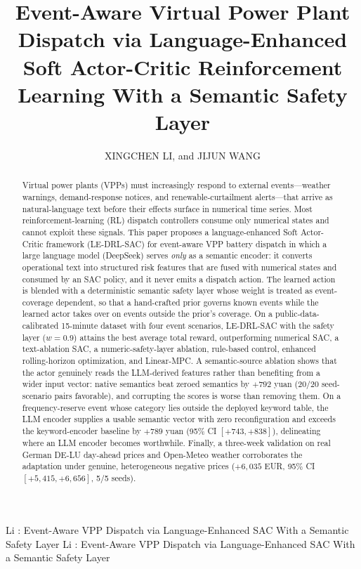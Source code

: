 \documentclass{ieeeaccess}
\begin{document}
\history{}
\doi{}

\title{Event-Aware Virtual Power Plant Dispatch via Language-Enhanced Soft Actor-Critic Reinforcement Learning With a Semantic Safety Layer}

\author{\uppercase{Xingchen Li}, and \uppercase{Jijun Wang}}
\address[1]{Shanghai University of Electric Power, Shanghai, China (e-mail: to be added)}
\address[2]{Shanghai University of Electric Power, Shanghai, China (e-mail: to be added)}

\markboth
{Li \headeretal: Event-Aware VPP Dispatch via Language-Enhanced SAC With a Semantic Safety Layer}
{Li \headeretal: Event-Aware VPP Dispatch via Language-Enhanced SAC With a Semantic Safety Layer}


\begin{abstract}
Virtual power plants (VPPs) must increasingly respond to external events---weather warnings, demand-response notices, and renewable-curtailment alerts---that arrive as natural-language text before their effects surface in numerical time series. Most reinforcement-learning (RL) dispatch controllers consume only numerical states and cannot exploit these signals. This paper proposes a language-enhanced Soft Actor-Critic framework (LE-DRL-SAC) for event-aware VPP battery dispatch in which a large language model (DeepSeek) serves \emph{only} as a semantic encoder: it converts operational text into structured risk features that are fused with numerical states and consumed by an SAC policy, and it never emits a dispatch action. The learned action is blended with a deterministic semantic safety layer whose weight is treated as event-coverage dependent, so that a hand-crafted prior governs known events while the learned actor takes over on events outside the prior's coverage. On a public-data-calibrated 15-minute dataset with four event scenarios, LE-DRL-SAC with the safety layer ($w=0.9$) attains the best average total reward, outperforming numerical SAC, a text-ablation SAC, a numeric-safety-layer ablation, rule-based control, enhanced rolling-horizon optimization, and Linear-MPC. A semantic-source ablation shows that the actor genuinely reads the LLM-derived features rather than benefiting from a wider input vector: native semantics beat zeroed semantics by $+792$ yuan (20/20 seed-scenario pairs favorable), and corrupting the scores is worse than removing them. On a frequency-reserve event whose category lies outside the deployed keyword table, the LLM encoder supplies a usable semantic vector with zero reconfiguration and exceeds the keyword-encoder baseline by $+789$ yuan (95\% CI $[+743, +838]$), delineating where an LLM encoder becomes worthwhile. Finally, a three-week validation on real German DE-LU day-ahead prices and Open-Meteo weather corroborates the adaptation under genuine, heterogeneous negative prices ($+6{,}035$ EUR, 95\% CI $[+5{,}415, +6{,}656]$, 5/5 seeds).
\end{abstract}
\end{document}
